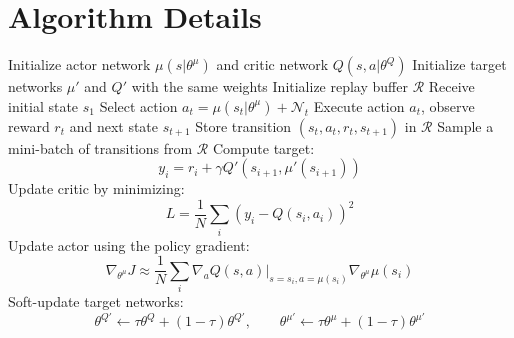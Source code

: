 \documentclass{article}
\begin{document}
\section{Algorithm Details}
\label{app:algorithms}
\FloatBarrier

\begin{algorithm}[t]
\caption{DDPG}
\label{alg:ddpg}
\begin{algorithmic}[1]
\State Initialize actor network $\mu(s|\theta^\mu)$ and critic network $Q(s,a|\theta^Q)$
\State Initialize target networks $\mu'$ and $Q'$ with the same weights
\State Initialize replay buffer $\mathcal{R}$
    \State Receive initial state $s_1$
        \State Select action $a_t = \mu(s_t|\theta^\mu) + \mathcal{N}_t$
        \State Execute action $a_t$, observe reward $r_t$ and next state $s_{t+1}$
        \State Store transition $(s_t,a_t,r_t,s_{t+1})$ in $\mathcal{R}$
        \State Sample a mini-batch of transitions from $\mathcal{R}$
        \State Compute target:
        \[
        y_i = r_i + \gamma Q'(s_{i+1}, \mu'(s_{i+1}))
        \]
        \State Update critic by minimizing:
        \[
        L = \frac{1}{N}\sum_i \left(y_i - Q(s_i,a_i)\right)^2
        \]
        \State Update actor using the policy gradient:
        \[
        \nabla_{\theta^\mu}J \approx
        \frac{1}{N}\sum_i
        \nabla_a Q(s,a)|_{s=s_i,a=\mu(s_i)}
        \nabla_{\theta^\mu}\mu(s_i)
        \]
        \State Soft-update target networks:
        \[
        \theta^{Q'} \leftarrow \tau \theta^Q + (1-\tau)\theta^{Q'},
        \qquad
        \theta^{\mu'} \leftarrow \tau \theta^\mu + (1-\tau)\theta^{\mu'}
        \]
    \EndFor
\EndFor
\end{algorithmic}
\end{algorithm}
\end{document}
